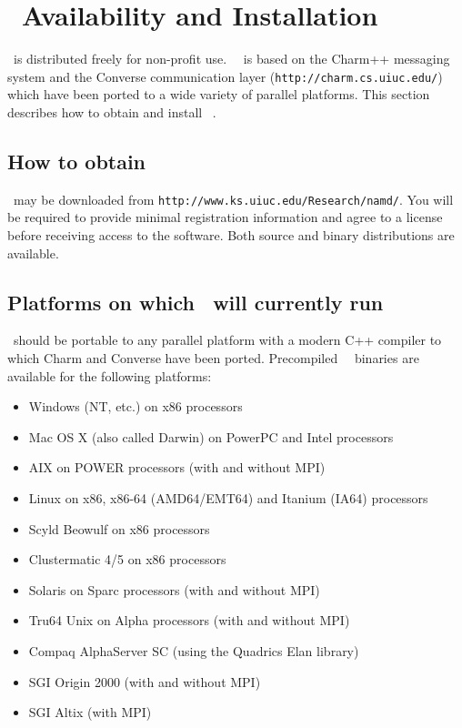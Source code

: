 
\section{\NAMD\ Availability and Installation}
\label{section:avail}

\NAMD\ is distributed freely for non-profit use.
\NAMD\ \NAMDVER\ is based on the Charm++ messaging system and the
Converse communication layer ({\tt http://charm.cs.uiuc.edu/})
which have been ported to a wide variety of parallel platforms.
This section describes how to obtain and install \NAMD\ \NAMDVER.

\subsection{How to obtain \NAMD}

\NAMD\ may be downloaded from {\tt http://www.ks.uiuc.edu/Research/namd/}.
You will be required to provide minimal registration information and
agree to a license before receiving access to the software.
Both source and binary distributions are available.

\subsection{Platforms on which \NAMD\ will currently run}
\NAMD\ should be portable to any parallel platform with a
modern C++ compiler to which Charm and Converse have been ported.
Precompiled \NAMD\ \NAMDVER\ binaries are available for the following platforms:  
\begin{itemize}
\item Windows (NT, etc.) on x86 processors 
\item Mac OS X (also called Darwin) on PowerPC and Intel processors
\item AIX on POWER processors (with and without MPI)
\item Linux on x86, x86-64 (AMD64/EMT64) and Itanium (IA64) processors 
\item Scyld Beowulf on x86 processors 
\item Clustermatic 4/5 on x86 processors 
\item Solaris on Sparc processors (with and without MPI)
\item Tru64 Unix on Alpha processors (with and without MPI)
\item Compaq AlphaServer SC (using the Quadrics Elan library)
\item SGI Origin 2000 (with and without MPI) 
\item SGI Altix (with MPI)
\end{itemize}

